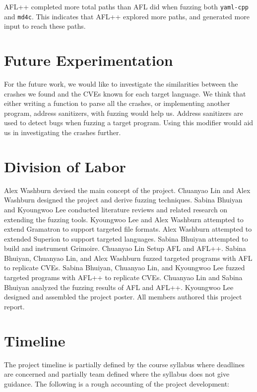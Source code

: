 \documentclass[12pt]{diazessay}
\begin{document}
AFL++ completed more total paths than AFL did when fuzzing both \texttt{yaml-cpp} and \texttt{md4c}.
This indicates that AFL++ explored more paths, and generated more input to reach these paths.


\section*{Future Experimentation}
For the future work, we would like to investigate the similarities between the crashes we found and the CVEs known for each target language. We think that either writing a function to parse all the crashes, or implementing another program, address sanitizers, with fuzzing would help us. Address sanitizers are used to detect bugs when fuzzing a target program. Using this modifier would aid us in investigating the crashes further.

\clearpage
\section*{Division of Labor}

Alex Washburn devised the main concept of the project.
Chuanyao Lin and Alex Washburn designed the project and derive fuzzing techniques.
Sabina Bhuiyan and Kyoungwoo Lee conducted literature reviews and related research on extending the fuzzing tools.
Kyoungwoo Lee and Alex Washburn attempted to extend Gramatron to support targeted file formats.
Alex Washburn attempted to extended Superion to support targeted languages.
Sabina Bhuiyan attempted to build and instrument Grimoire.
Chuanyao Lin Setup AFL and AFL++.
Sabina Bhuiyan, Chuanyao Lin, and Alex Washburn fuzzed targeted programs with AFL to replicate CVEs.
Sabina Bhuiyan, Chuanyao Lin, and Kyoungwoo Lee fuzzed targeted programs with AFL++ to replicate CVEs. 
Chuanyao Lin and Sabina Bhuiyan analyzed the fuzzing results of AFL and AFL++.
Kyoungwoo Lee designed and assembled the project poster.
All members authored this project report.

\section*{Timeline}

The project timeline is partially defined by the course syllabus where deadlines are concerned and partially team defined where the syllabus does not give guidance.
The following is a rough accounting of the project development:
\end{document}

